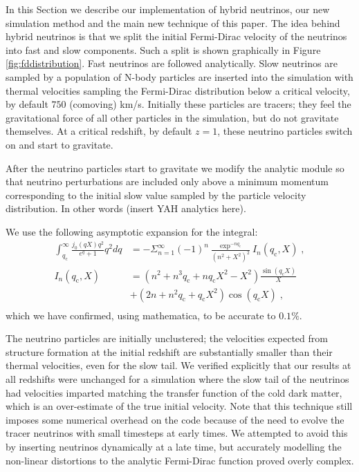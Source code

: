 \documentclass[useAMS, usenatbib]{mnras}
\begin{document}
In this Section we describe our implementation of hybrid neutrinos, our new simulation method and the main new technique of this paper. The idea behind hybrid neutrinos is that we split the initial Fermi-Dirac velocity of the neutrinos into fast and slow components. Such a split is shown graphically in Figure \ref{fig:fddistribution}. Fast neutrinos are followed analytically. Slow neutrinos are sampled by a population of N-body particles are inserted into the simulation with thermal velocities sampling the Fermi-Dirac distribution below a critical velocity, by default $750$ (comoving) km/s. Initially these particles are tracers; they feel the gravitational force of all other particles in the simulation, but do not gravitate themselves. At a critical redshift, by default $z=1$, these neutrino particles switch on and start to gravitate.

After the neutrino particles start to gravitate we modify the
analytic module so that neutrino perturbations are included only above a
minimum momentum corresponding to the initial slow value sampled by the
particle velocity distribution. In other words (insert YAH analytics here).

We use the following asymptotic expansion for the integral:
\begin{align}
 \int^\infty_{q_\mathrm{c}} \frac{j_0(qX) q^2}{e^q + 1} q^2 dq &= - \Sigma^{\infty}_{n=1} (-1)^n \frac{\exp^{-n q_\mathrm{c}}}{(n^2+X^2)^2} I_n(q_\mathrm{c},X) \;,\\
 I_n(q_\mathrm{c},X) &= (n^2 + n^3 q_\mathrm{c} + n q_\mathrm{c} X^2 - X^2) \frac{\sin(q_\mathrm{c} X)}{X} \\
 &+ (2n + n^2 q_\mathrm{c} + q_\mathrm{c} X^2) \cos(q_\mathrm{c} X)\;,\\
\end{align}
which we have confirmed, using mathematica, to be accurate to $0.1\%$.

The neutrino particles are initially unclustered; the velocities expected from structure formation at the initial redshift are substantially smaller than their thermal velocities, even for the slow tail. We verified explicitly that our results at all redshifts were unchanged for a simulation where the slow tail of the neutrinos had velocities imparted matching the transfer function of the cold dark matter, which is an over-estimate of the true initial velocity.
Note that this technique still imposes some numerical overhead on the code because of the need to evolve the tracer neutrinos with small timesteps at early times. We attempted to avoid this by inserting neutrinos dynamically at a late time, but accurately modelling the non-linear distortions to the analytic Fermi-Dirac function proved overly complex.
\end{document}
